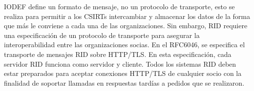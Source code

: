 IODEF define un formato de mensaje, no un protocolo de transporte, esto se 
realiza para permitir a los CSIRTs intercambiar y almacenar los datos de la 
forma que más le conviene a cada una de las organizaciones. Sin embargo, RID 
requiere una especificación de un protocolo de transporte para asegurar la 
interoperabilidad entre las organizaciones socias. En el RFC6046, se especifica 
el transporte de mensajes RID sobre HTTP/TLS. En esta especificación, cada 
servidor RID funciona como servidor y cliente. Todos los sistemas RID deben 
estar preparados para aceptar conexiones HTTP/TLS de cualquier socio con la 
finalidad de soportar llamadas en respuestas tardías a pedidos que se realizaron.




